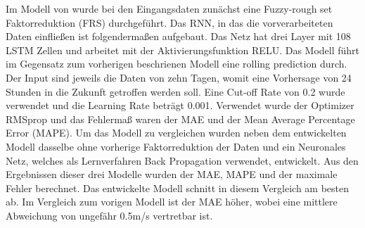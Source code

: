 \documentclass[
12pt, %
toc=listofnumbered, %
toc=chapterentrydotfill, %
numbers=noenddot, %
captions=tableheading, %
bibliography=numbered
]{scrreprt}
\begin{document}
Im Modell von \citeauthor{2018_Yao_MultidimensionalLSTMNetworks} wurde bei den Eingangsdaten zunächst eine Fuzzy-rough set Faktorreduktion (FRS) durchgeführt. Das RNN, in das die vorverarbeiteten Daten 
einfließen ist folgendermaßen aufgebaut. Das Netz hat drei Layer mit 108 LSTM Zellen und arbeitet mit der Aktivierungsfunktion RELU. Das Modell führt im Gegensatz zum vorherigen beschrienen Modell eine 
rolling prediction durch. Der Input sind jeweils die Daten von zehn Tagen, womit eine Vorhersage von 24 Stunden in die Zukunft getroffen werden soll. 
Eine Cut-off Rate von 0.2 wurde verwendet und die Learning Rate beträgt 0.001. Verwendet wurde der Optimizer RMSprop und das Fehlermaß waren der MAE und der Mean Average Percentage Error (MAPE). 
Um das Modell zu vergleichen wurden neben dem entwickelten Modell dasselbe ohne vorherige Faktorreduktion der Daten und ein Neuronales Netz, welches als Lernverfahren Back Propagation verwendet, entwickelt. 
Aus den Ergebnissen dieser drei Modelle wurden der MAE, MAPE und der maximale Fehler berechnet. Das entwickelte Modell schnitt in diesem Vergleich am besten ab. Im Vergleich zum vorigen Modell ist der MAE höher, 
wobei eine mittlere Abweichung von ungefähr 0.5m/s vertretbar ist.
\end{document}
